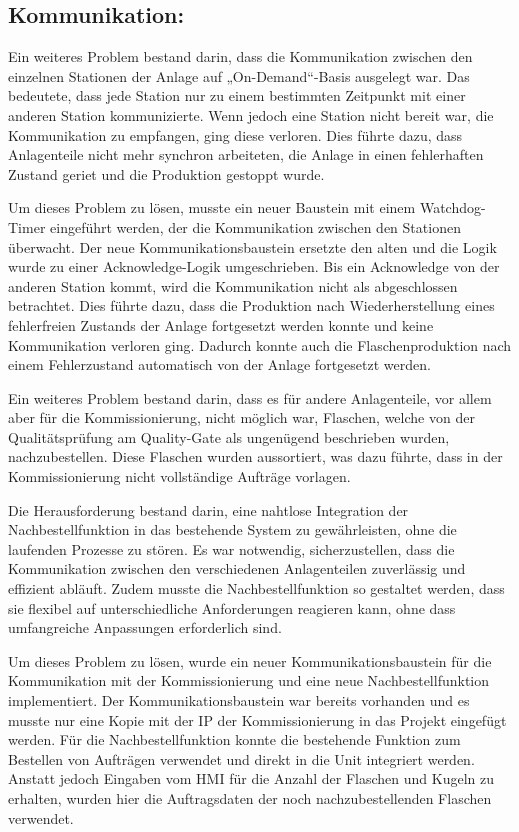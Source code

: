 \subsection{Kommunikation:} 

Ein weiteres Problem bestand darin, dass die Kommunikation zwischen den einzelnen Stationen der Anlage auf „On-Demand“-Basis ausgelegt war. Das bedeutete, dass jede Station nur zu einem bestimmten Zeitpunkt mit einer anderen Station kommunizierte. Wenn jedoch eine Station nicht bereit war, die Kommunikation zu empfangen, ging diese verloren. Dies führte dazu, dass Anlagenteile nicht mehr synchron arbeiteten, die Anlage in einen fehlerhaften Zustand geriet und die Produktion gestoppt wurde. 

Um dieses Problem zu lösen, musste ein neuer Baustein mit einem Watchdog-Timer eingeführt werden, der die Kommunikation zwischen den Stationen überwacht. Der neue Kommunikationsbaustein ersetzte den alten und die Logik wurde zu einer Acknowledge-Logik umgeschrieben. Bis ein Acknowledge von der anderen Station kommt, wird die Kommunikation nicht als abgeschlossen betrachtet. Dies führte dazu, dass die Produktion nach Wiederherstellung eines fehlerfreien Zustands der Anlage fortgesetzt werden konnte und keine Kommunikation verloren ging. Dadurch konnte auch die Flaschenproduktion nach einem Fehlerzustand automatisch von der Anlage fortgesetzt werden.

Ein weiteres Problem bestand darin, dass es für andere Anlagenteile, vor allem aber für die Kommissionierung, nicht möglich war, Flaschen, welche von der Qualitätsprüfung am Quality-Gate als ungenügend beschrieben wurden, nachzubestellen. Diese Flaschen wurden aussortiert, was dazu führte, dass in der Kommissionierung nicht vollständige Aufträge vorlagen.

Die Herausforderung bestand darin, eine nahtlose Integration der Nachbestellfunktion in das bestehende System zu gewährleisten, ohne die laufenden Prozesse zu stören. Es war notwendig, sicherzustellen, dass die Kommunikation zwischen den verschiedenen Anlagenteilen zuverlässig und effizient abläuft. Zudem musste die Nachbestellfunktion so gestaltet werden, dass sie flexibel auf unterschiedliche Anforderungen reagieren kann, ohne dass umfangreiche Anpassungen erforderlich sind.

Um dieses Problem zu lösen, wurde ein neuer Kommunikationsbaustein für die Kommunikation mit der Kommissionierung und eine neue Nachbestellfunktion implementiert. Der Kommunikationsbaustein war bereits vorhanden und es musste nur eine Kopie mit der IP der Kommissionierung in das Projekt eingefügt werden. Für die Nachbestellfunktion konnte die bestehende Funktion zum Bestellen von Aufträgen verwendet und direkt in die Unit integriert werden. Anstatt jedoch Eingaben vom HMI für die Anzahl der Flaschen und Kugeln zu erhalten, wurden hier die Auftragsdaten der noch nachzubestellenden Flaschen verwendet.

